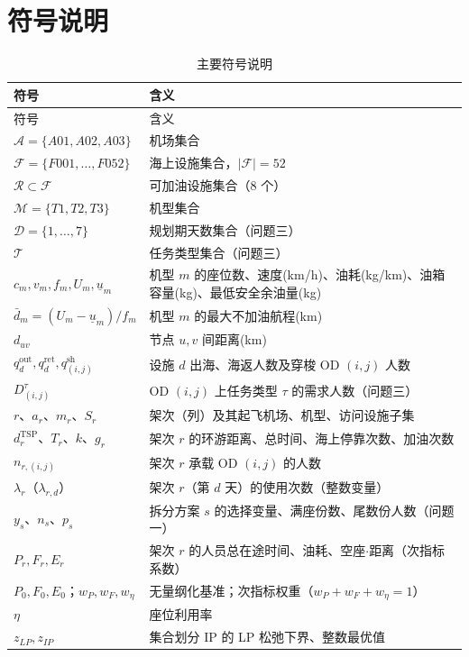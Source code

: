 \documentclass[UTF8,zihao=-4]{ctexart}
\numberwithin{figure}{section}
\numberwithin{table}{section}
\begin{document}
\section{符号说明}

\begin{longtable}{p{3.4cm}@{\qquad}p{10.2cm}}
  \caption{主要符号说明}\label{tab:notation}\\
  \toprule
  符号 & 含义 \\
  \midrule
  \endfirsthead
  \toprule
  符号 & 含义 \\
  \midrule
  \endhead
  $\mathcal{A}=\{A01,A02,A03\}$ & 机场集合 \\
  $\mathcal{F}=\{F001,\dots,F052\}$ & 海上设施集合，$|\mathcal{F}|=52$ \\
  $\mathcal{R}\subset\mathcal{F}$ & 可加油设施集合（8 个） \\
  $\mathcal{M}=\{T1,T2,T3\}$ & 机型集合 \\
  $\mathcal{D}=\{1,\dots,7\}$ & 规划期天数集合（问题三） \\
  $\mathcal{T}$ & 任务类型集合（问题三） \\
  $c_m, v_m, f_m, U_m, \underline{u}_m$ & 机型 $m$ 的座位数、速度(km/h)、油耗(kg/km)、油箱容量(kg)、最低安全余油量(kg) \\
  $\bar d_m=(U_m-\underline{u}_m)/f_m$ & 机型 $m$ 的最大不加油航程(km) \\
  $d_{uv}$ & 节点 $u,v$ 间距离(km) \\
  $q_d^{\mathrm{out}}, q_d^{\mathrm{ret}}, q^{\mathrm{sh}}_{(i,j)}$ & 设施 $d$ 出海、海返人数及穿梭 OD $(i,j)$ 人数 \\
  $D_{(i,j)}^{\tau}$ & OD $(i,j)$ 上任务类型 $\tau$ 的需求人数（问题三） \\
  $r$、$a_r$、$m_r$、$S_r$ & 架次（列）及其起飞机场、机型、访问设施子集 \\
  $d_r^{\mathrm{TSP}}$、$T_r$、$k$、$g_r$ & 架次 $r$ 的环游距离、总时间、海上停靠次数、加油次数 \\
  $n_{r,(i,j)}$ & 架次 $r$ 承载 OD $(i,j)$ 的人数 \\
  $\lambda_r$（$\lambda_{r,d}$） & 架次 $r$（第 $d$ 天）的使用次数（整数变量） \\
  $y_s$、$n_s$、$p_s$ & 拆分方案 $s$ 的选择变量、满座份数、尾数份人数（问题一） \\
  $P_r, F_r, E_r$ & 架次 $r$ 的人员总在途时间、油耗、空座$\cdot$距离（次指标系数） \\
  $P_0,F_0,E_0$；$w_P,w_F,w_\eta$ & 无量纲化基准；次指标权重（$w_P+w_F+w_\eta=1$） \\
  $\eta$ & 座位利用率 \\
  $z_{LP}, z_{IP}$ & 集合划分 IP 的 LP 松弛下界、整数最优值 \\
  \bottomrule
\end{longtable}
\end{document}
